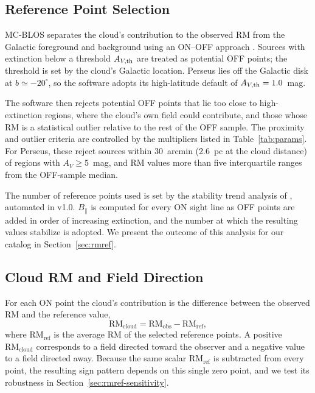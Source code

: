 \documentclass[twocolumn]{aastex701}
\begin{document}
  \subsection{Reference Point Selection}

  MC-BLOS separates the cloud's contribution to the observed RM from the
  Galactic foreground and background using an ON--OFF approach
  \citep{tahani2018}. Sources with extinction below a threshold $A_{V,\rm th}$
  are treated as potential OFF points; the threshold is set by the cloud's
  Galactic location. Perseus lies off the Galactic disk at $b \simeq -20^\circ$,
  so the software adopts its high-latitude default of
  $A_{V,\rm th} = 1.0$~mag.

  The software then rejects potential OFF points that lie too close to
  high-extinction regions, where the cloud's own field could contribute, and
  those whose RM is a statistical outlier relative to the rest of the OFF
  sample. The proximity and outlier criteria are controlled by the multipliers listed
in Table~\ref{tab:params}. For Perseus, these reject sources within
30~arcmin (2.6~pc at the cloud distance) of regions with $A_V \geq 5$~mag,
and RM values more than five interquartile ranges from the OFF-sample median.

  The number of reference points used is set by the stability trend
  analysis of \citet{tahani2018}, automated in v1.0. $B_\parallel$ is computed
  for every ON sight line as OFF points are added in order of increasing
  extinction, and the number at which the resulting values stabilize is adopted.
  We present the outcome of this analysis for our catalog in
  Section~\ref{sec:rmref}.

  \subsection{Cloud RM and Field Direction}

  For each ON point the cloud's contribution is the difference between the
  observed RM and the reference value,
  \begin{equation}
  \label{eq:rmcloud}
      \mathrm{RM_{cloud}} = \mathrm{RM_{obs}} - \mathrm{RM_{ref}},
  \end{equation}
  where $\mathrm{RM_{ref}}$ is the average RM of the selected reference points.
  A positive $\mathrm{RM_{cloud}}$ corresponds to a field directed toward the
  observer and a negative value to a field directed away. Because the same
  scalar $\mathrm{RM_{ref}}$ is subtracted from every point, the resulting
  sign pattern depends on this single zero point, and we test its robustness in
  Section~\ref{sec:rmref-sensitivity}.
\end{document}
